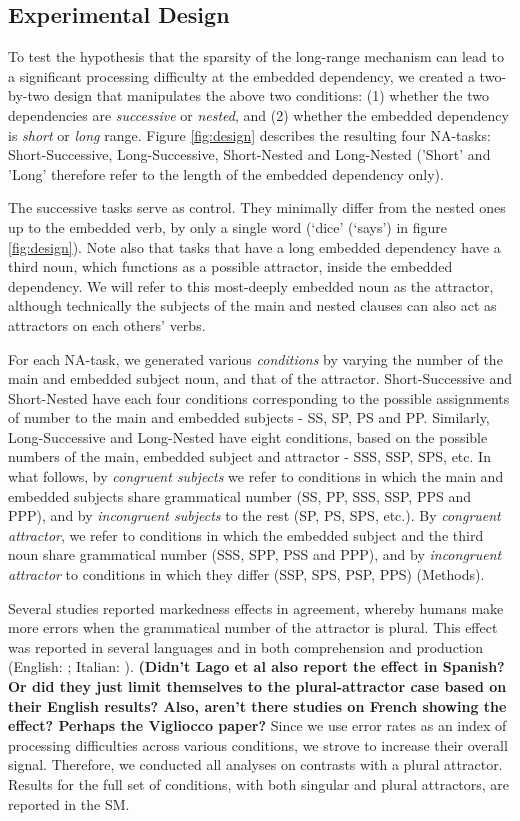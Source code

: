 \subsection{Experimental Design}
To test the hypothesis that the sparsity of the long-range mechanism can lead to a significant processing difficulty at the embedded dependency, we created a two-by-two design that manipulates the above two conditions: (1) whether the two dependencies are \textit{successive} or \textit{nested}, and (2) whether the embedded dependency is \textit{short} or \textit{long} range. Figure \ref{fig:design} describes the resulting four NA-tasks: Short-Successive, Long-Successive, Short-Nested and Long-Nested ('Short' and 'Long' therefore refer to the length of the embedded dependency only). 

The successive tasks serve as control. They minimally differ from the nested ones up to the embedded verb, by only a single word (`dice' (`says') in figure \ref{fig:design}). Note also that tasks that have a long embedded dependency have a third noun, which functions as a possible attractor, inside the embedded dependency. We will refer to this most-deeply embedded noun as the attractor, although technically the subjects of the main and nested clauses can also act as attractors on each others' verbs.

For each NA-task, we generated various \textit{conditions} by varying the number of the main and embedded subject noun, and that of the attractor. Short-Successive and Short-Nested have each four conditions corresponding to the possible assignments of number to the main and embedded subjects - SS, SP, PS and PP. Similarly, Long-Successive and Long-Nested have eight conditions, based on the possible numbers of the main, embedded subject and attractor - SSS, SSP, SPS, etc. In what follows, by \textit{congruent subjects} we refer to conditions in which the main and embedded subjects share grammatical number (SS, PP, SSS, SSP, PPS and PPP), and by \textit{incongruent subjects} to the rest (SP, PS, SPS, etc.). By \textit{congruent attractor}, we refer to conditions in which the embedded subject and the third noun share grammatical number (SSS, SPP, PSS and PPP), and by \textit{incongruent attractor} to conditions in which they differ (SSP, SPS, PSP, PPS) (Methods).

Several studies reported markedness effects in agreement, whereby humans make more errors when the grammatical number of the attractor is plural. This effect was reported in several languages and in both comprehension and production (English: \citet{Bock:Miller:1991, eberhard1997marked, wagers2009agreement, lago2015agreement}; Italian: \citet{vigliocco1995constructing}). \textbf{(Didn't Lago et al also report the effect in Spanish? Or did they just limit themselves to the plural-attractor case based on their English results? Also, aren't there studies on French showing the effect? Perhaps the Vigliocco paper?} Since we use error rates as an index of processing difficulties across various conditions, we strove to increase their overall signal. Therefore, we conducted all analyses on contrasts with a plural attractor. Results for the full set of conditions, with both singular and plural attractors, are reported in the SM.

